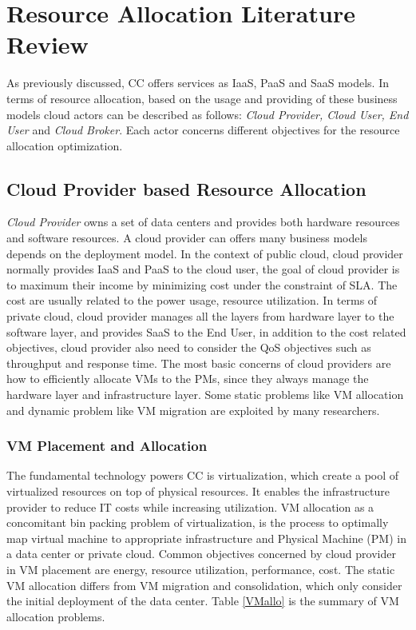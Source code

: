 \documentclass[onecolumn,10pt]{asme2ej}
\begin{document}
\section{Resource Allocation Literature Review}

As previously discussed, CC offers services as IaaS, PaaS and SaaS models. In terms of resource allocation, based on the usage and providing of these business models cloud actors can be described as follows: \emph{Cloud Provider, Cloud User, End User} and \emph{Cloud Broker}. Each actor concerns different objectives for the resource allocation optimization.

\subsection{Cloud Provider based Resource Allocation}

\emph{Cloud Provider} owns a set of data centers and provides both hardware resources and software resources. A cloud provider can offers many business models depends on the deployment model. In the context of public cloud, cloud provider normally provides IaaS and PaaS to the cloud user, the goal of cloud provider is to maximum their income by minimizing cost under the constraint of SLA. The cost are usually related to the power usage, resource utilization. In terms of private cloud, cloud provider manages all the layers from hardware layer to the software layer, and provides SaaS to the End User, in addition to the cost related objectives, cloud provider also need to consider the QoS objectives such as throughput and response time. The most basic concerns of cloud providers are how to efficiently allocate VMs to the PMs, since they always manage the hardware layer and infrastructure layer. Some static problems like VM allocation and dynamic problem like VM migration are exploited by many researchers.

\subsubsection{VM Placement and Allocation}
The fundamental technology powers CC is virtualization, which create a pool of virtualized resources on top of physical resources. It enables the infrastructure provider to reduce IT costs while increasing utilization. VM allocation as a concomitant bin packing problem of virtualization, is the process to optimally map virtual machine to appropriate infrastructure and Physical Machine (PM) in a data center or private cloud. Common objectives concerned by cloud provider in VM placement are energy, resource utilization, performance, cost. The static VM allocation differs from VM migration and consolidation, which only consider the initial deployment of the data center. Table \ref{VMallo} is the summary of VM allocation problems.  
\end{document}
